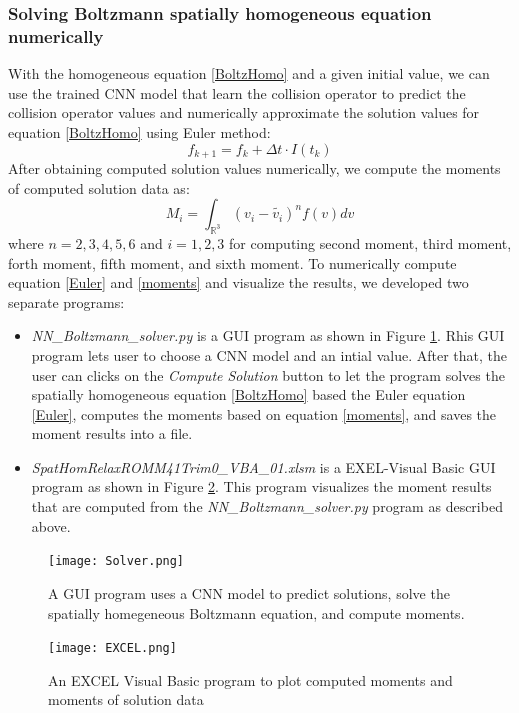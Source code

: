 \documentclass{article}
\begin{document}
\subsubsection{Solving Boltzmann spatially homogeneous equation numerically}
With the homogeneous equation \ref{BoltzHomo} and a given initial value, we can use  the trained CNN model that learn the collision operator to predict the collision operator values and  numerically approximate the solution values for equation \ref{BoltzHomo} using Euler method:
\begin{equation} \label{Euler}
f_{k+1}= f_k + \Delta t \cdot I(t_k)
\end{equation}
After obtaining computed solution values numerically, we compute the moments of computed solution data as:
\begin{equation} \label{moments}
M_i = \int_{\mathbb{R}^3} (v_i - \tilde{v_i})^n f(v)dv
\end{equation}
where $n=2,3,4,5,6$ and $i=1,2,3$ for computing second moment, third moment, forth moment, fifth moment, and sixth moment. To numerically compute  equation \ref{Euler} and \ref{moments} and visualize the results, we developed two separate programs:  
\begin{itemize}
	\item \emph{NN\_Boltzmann\_solver.py} is a GUI program as shown in Figure \ref{fig:solver1}. Rhis GUI program lets user to choose a CNN model and an intial value. After that, the user can clicks on the \emph{Compute Solution} button to let the program solves the spatially homogeneous equation \ref{BoltzHomo} based the Euler equation \ref{Euler}, computes the moments based on equation \ref{moments}, and saves the moment results into a file.
	\item \emph{SpatHomRelaxROMM41Trim0\_VBA\_01.xlsm} is a EXEL-Visual Basic GUI program as shown in Figure \ref{fig:EXCEL1}. This program visualizes the moment results that are computed from the \emph{NN\_Boltzmann\_solver.py} program as described above.
\end{itemize}

\begin{figure}[h!]
	\centering
	\texttt{[image: Solver.png]}
	\caption{A GUI program uses a CNN model to predict solutions, solve the spatially homegeneous Boltzmann equation, and compute moments. }
	\label{fig:solver1}
\end{figure}

\begin{figure}[h!]
	\centering
	\texttt{[image: EXCEL.png]}
	\caption{An EXCEL Visual Basic program to plot computed moments and moments of solution data}
	\label{fig:EXCEL1}
\end{figure}
\end{document}
